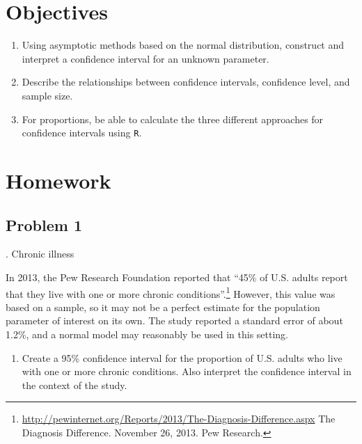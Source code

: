 \documentclass[
]{book}
\providecommand{\tightlist}{%
  \setlength{\itemsep}{0pt}\setlength{\parskip}{0pt}}
\begin{document}
\hypertarget{objectives-20}{%
\section{Objectives}\label{objectives-20}}

\begin{enumerate}
\def\labelenumi{\arabic{enumi})}
\tightlist
\item
  Using asymptotic methods based on the normal distribution, construct and interpret a confidence interval for an unknown parameter.\\
\item
  Describe the relationships between confidence intervals, confidence level, and sample size.\\
\item
  For proportions, be able to calculate the three different approaches for confidence intervals using \texttt{R}.
\end{enumerate}

\hypertarget{homework-21}{%
\section{Homework}\label{homework-21}}

\hypertarget{problem-1-21}{%
\subsection{Problem 1}\label{problem-1-21}}

. Chronic illness

In 2013, the Pew Research Foundation reported that ``45\% of U.S. adults report that they live with one or more chronic conditions''.\footnote{\url{http://pewinternet.org/Reports/2013/The-Diagnosis-Difference.aspx} The Diagnosis Difference. November 26, 2013. Pew Research.} However, this value was based on a sample, so it may not be a perfect estimate for the population parameter of interest on its own. The study reported a standard error of about 1.2\%, and a normal model may reasonably be used in this setting.

\begin{enumerate}
\def\labelenumi{\alph{enumi}.}
\tightlist
\item
  Create a 95\% confidence interval for the proportion of U.S. adults who live with one or more chronic conditions. Also interpret the confidence interval in the context of the study.
\end{enumerate}
\end{document}
